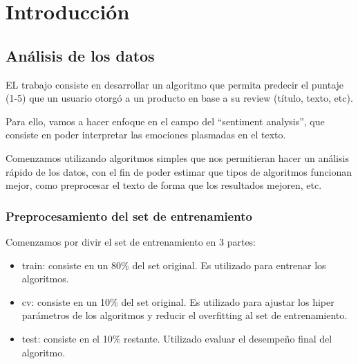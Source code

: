 
\chapter{Introducci\'on} %

\label{Chapter1}


\section{An\'alisis de los datos}

EL trabajo consiste en desarrollar un algoritmo que permita predecir el puntaje (1-5) que un usuario
otorg\'o a un producto en base a su review (t\'itulo, texto, etc).

Para ello, vamos a hacer enfoque en el campo del ``sentiment analysis'', que consiste en poder
interpretar las emociones plasmadas en el texto.

Comenzamos utilizando algoritmos simples que nos permitieran hacer un an\'alisis r\'apido de los
datos, con el fin de poder estimar que tipos de algoritmos funcionan mejor, como preprocesar el
texto de forma que los resultados mejoren, etc.

\subsection{Preprocesamiento del set de entrenamiento}

Comenzamos por divir el set de entrenamiento en 3 partes:\\


\begin{itemize}
\setlength\itemsep{0em}
  \item train: consiste en un 80\% del set original. Es utilizado para entrenar los algoritmos.
  \item cv: consiste en un 10\% del set original. Es utilizado para ajustar los hiper par\'ametros de los
        algoritmos y reducir el overfitting al set de entrenamiento.
  \item test: consiste en el 10\% restante. Utilizado evaluar el desempe\~no final del algoritmo.
\end{itemize}

